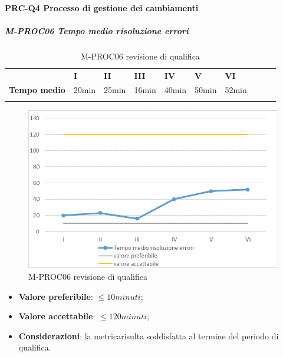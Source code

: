 \paragraph*{PRC-Q4 Processo di gestione dei cambiamenti}
\subparagraph{M-PROC06 Tempo medio risoluzione errori} \mbox{}
\begin{longtable}[H!] {						
		>{}p{50mm}  		
		>{}p{8mm}
		>{}p{8mm}		
		>{}p{8mm}		
		>{}p{8mm}		
		>{}p{8mm}		
		>{}p{8mm}
		>{}p{8mm}
		>{}p{8mm}
		>{}p{8mm}
	}
	\rowcolor{gray!50}
	\textbf{} & \textbf{I} & \textbf{II} & \textbf{III} & \textbf{IV} & \textbf{V} & \textbf{VI} \TBstrut \\ [2mm]
	\textbf{Tempo medio} & 20min & 25min & 16min & 40min & 50min & 52min \TBstrut \\ [2mm]
	\rowcolor{white}
	\caption{M-PROC06 revisione di qualifica}
\end{longtable}
\begin{figure}[H] 	
	\includegraphics[width=\linewidth]{./img/grafici/RQ6.png}	
	\caption{M-PROC06 revisione di qualifica}	
\end{figure}
\begin{itemize}
	\item \textbf{Valore preferibile}: $\le10minuti$;
	\item \textbf{Valore accettabile}: $\le120minuti$;
	\item \textbf{Considerazioni}: la metrica\glosp risulta soddisfatta al termine del periodo di qualifica.
\end{itemize}

